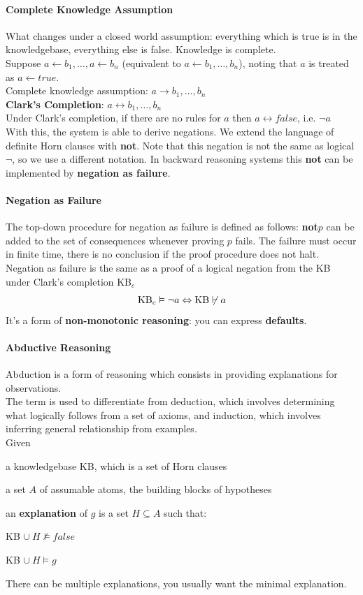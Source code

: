 \documentclass[10pt]{report}
\begin{document}
\paragraph{Complete Knowledge Assumption} What changes under a closed world assumption: everything which is true is in the knowledgebase, everything else is false. Knowledge is complete.\\
Suppose $a\leftarrow b_1,\ldots,a\leftarrow b_n$ (equivalent to $a\leftarrow b_1,\ldots,b_n$), noting that $a$ is treated as $a\leftarrow true$.\\
Complete knowledge assumption: $a\rightarrow b_1,\ldots,b_n$\\
\textbf{Clark's Completion}: $a\leftrightarrow b_1,\ldots,b_n$\\
Under Clark's completion, if there are no rules for $a$ then $a\leftrightarrow false$, i.e. $\neg a$\\
With this, the system is able to derive negations. We extend the language of definite Horn clauses with \textbf{not}. Note that this negation is not the same as logical $\neg$, so we use a different notation. In backward reasoning systems this \textbf{not} can be implemented by \textbf{negation as failure}.
\paragraph{Negation as Failure} The top-down procedure for negation as failure is defined as follows: \textbf{not}$p$ can be added to the set of consequences whenever proving $p$ fails. The failure must occur in finite time, there is no conclusion if the proof procedure does not halt.\\
Negation as failure is the same as a proof of a logical negation from the KB under Clark's completion KB$_c$ $$\hbox{KB}_c\vDash\neg a\Leftrightarrow\hbox{KB}\not\vdash a$$
It's a form of \textbf{non-monotonic reasoning}: you can express \textbf{defaults}.
\paragraph{Abductive Reasoning} Abduction is a form of reasoning which consists in providing explanations for observations.\\
The term is used to differentiate from deduction, which involves determining what logically follows from a set of axioms, and induction, which involves inferring general relationship from examples.\\
Given\begin{list}{}{}
	\item a knowledgebase KB, which is a set of Horn clauses
	\item a set $A$ of assumable atoms, the building blocks of hypotheses
\end{list}
an \textbf{explanation} of $g$ is a set $H\subseteq A$ such that:
\begin{list}{}{}
	\item KB $\cup\:H\not\vDash false$
	\item KB $\cup\:H\vDash g$
\end{list}
There can be multiple explanations, you usually want the minimal explanation.
\end{document}

